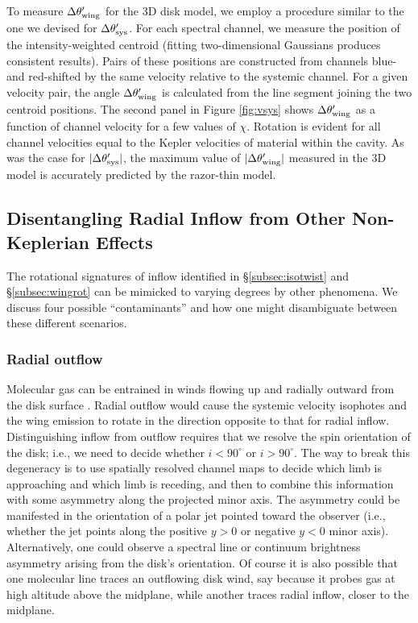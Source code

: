 To measure $\Delta \theta'_{\rm wing}$ for the 3D disk model, we employ a 
procedure similar to the one we devised for $\Delta \theta'_{\rm sys}$.  For 
each spectral channel, we measure the position of the intensity-weighted 
centroid (fitting two-dimensional Gaussians produces consistent results).  
Pairs of these positions are constructed from channels blue- and red-shifted by 
the same velocity relative to the systemic channel.  For a given velocity pair, 
the angle $\Delta \theta'_{\rm wing}$ is calculated from the line segment 
joining the two centroid positions.  The second panel in Figure \ref{fig:vsys} 
shows $\Delta \theta'_{\rm wing}$ as a function of channel velocity for a few 
values of $\chi$.  Rotation is evident for all channel velocities equal to the
Kepler velocities of material within the cavity.  As was the case for $|\Delta 
\theta'_{\rm sys}|$, the maximum value of $|\Delta \theta'_{\rm wing}|$ 
measured in the 3D model is accurately predicted by the razor-thin model.  


\subsection{Disentangling Radial Inflow from Other Non-Keplerian Effects}
\label{subsec:disentangle}

The rotational signatures of inflow identified in \S\ref{subsec:isotwist} and 
\S\ref{subsec:wingrot} can be mimicked to varying degrees by other phenomena.  
We discuss four possible ``contaminants'' and how one might disambiguate 
between these different scenarios.


\subsubsection{Radial outflow} \label{out} 

Molecular gas can be entrained in winds flowing up and radially outward from 
the disk surface \citep[e.g.,][]{pontoppidan11,bast11,klaassen13}.  Radial 
outflow would cause the systemic velocity isophotes and the wing emission to 
rotate in the direction opposite to that for radial inflow.  Distinguishing 
inflow from outflow requires that we resolve the spin orientation of the disk; 
i.e., we need to decide whether $i < 90^{\circ}$ or $i > 90^{\circ}$.  The way 
to break this degeneracy is to use spatially resolved channel maps to decide 
which limb is approaching and which limb is receding, and then to combine this 
information with some asymmetry along the projected minor axis.  The asymmetry 
could be manifested in the orientation of a polar jet pointed toward the 
observer (i.e., whether the jet points along the positive $y > 0$ or negative 
$y < 0$ minor axis).  
Alternatively, one could observe a spectral line 
\citep{dutrey98,guilloteau98,rosenfeld13} or continuum 
\citep{augereau99,weinberger99,fukagawa06,thalmann10} brightness asymmetry 
arising from the disk's orientation.  Of course it is 
also possible that one molecular line traces an outflowing disk wind, say 
because it probes gas at high altitude above the midplane, while another traces 
radial inflow, closer to the midplane.

